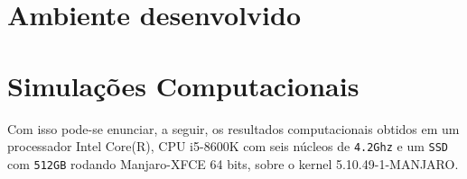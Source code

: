 
\section{Ambiente desenvolvido}

\section{Simulações Computacionais}

Com isso pode-se enunciar, a seguir, os resultados computacionais obtidos em um processador Intel Core(R), CPU i5-8600K com seis núcleos de \texttt{4.2Ghz} e um \texttt{SSD} com \texttt{512GB} rodando Manjaro-XFCE 64 bits, sobre o kernel 5.10.49-1-MANJARO.